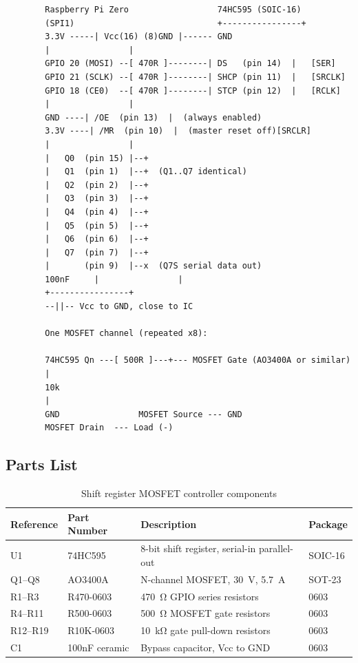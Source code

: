 \documentclass[12pt,letterpaper]{article}
\begin{document}
	\begin{verbatim}
		Raspberry Pi Zero                  74HC595 (SOIC-16)
		(SPI1)                             +----------------+
		3.3V -----| Vcc(16) (8)GND |------ GND
		|                |
		GPIO 20 (MOSI) --[ 470R ]--------| DS   (pin 14)  |   [SER]
		GPIO 21 (SCLK) --[ 470R ]--------| SHCP (pin 11)  |   [SRCLK]
		GPIO 18 (CE0)  --[ 470R ]--------| STCP (pin 12)  |   [RCLK]
		|                |
		GND ----| /OE  (pin 13)  |  (always enabled)
		3.3V ----| /MR  (pin 10)  |  (master reset off)[SRCLR]
		|                |
		|   Q0  (pin 15) |--+
		|   Q1  (pin 1)  |--+  (Q1..Q7 identical)
		|   Q2  (pin 2)  |--+
		|   Q3  (pin 3)  |--+
		|   Q4  (pin 4)  |--+
		|   Q5  (pin 5)  |--+
		|   Q6  (pin 6)  |--+
		|   Q7  (pin 7)  |--+
		|       (pin 9)  |--x  (Q7S serial data out)
		100nF     |                |
		+----------------+
		--||-- Vcc to GND, close to IC
		
		One MOSFET channel (repeated x8):
		
		74HC595 Qn ---[ 500R ]---+--- MOSFET Gate (AO3400A or similar)
		|
		10k
		|
		GND                MOSFET Source --- GND
		MOSFET Drain  --- Load (-)
	\end{verbatim}
	
	\subsection{Parts List}
	
	\begin{table}[h]
		\centering
		\begin{tabular}{llll}
			\hline
			\textbf{Reference} & \textbf{Part Number} & \textbf{Description} & \textbf{Package} \\
			\hline
			U1      & 74HC595           & 8-bit shift register, serial-in parallel-out  & SOIC-16 \\
			Q1--Q8  & AO3400A           & N-channel MOSFET, \SI{30}{\volt}, \SI{5.7}{\ampere} & SOT-23 \\
			R1--R3  & R470-0603         & \SI{470}{\ohm} GPIO series resistors          & 0603 \\
			R4--R11 & R500-0603         & \SI{500}{\ohm} MOSFET gate resistors          & 0603 \\
			R12--R19 & R10K-0603        & \SI{10}{\kilo\ohm} gate pull-down resistors   & 0603 \\
			C1      & 100nF ceramic     & Bypass capacitor, Vcc to GND                  & 0603 \\
			\hline
		\end{tabular}
		\caption{Shift register MOSFET controller components}
		\label{tab:shiftreg_parts}
	\end{table}
	
\end{document}
